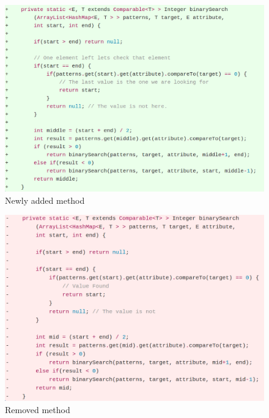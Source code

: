 \begin{figure}[!ht]
    \centering
        \includegraphics[width=1.0\textwidth]{images/added_example}
    \caption{Newly added method}
    \label{fig:added_method}
\end{figure}

\begin{figure}[!ht]
    \centering
        \includegraphics[width=1.0\textwidth]{images/deleted_method}
    \caption{Removed method}
    \label{fig:removed_method}
\end{figure}

